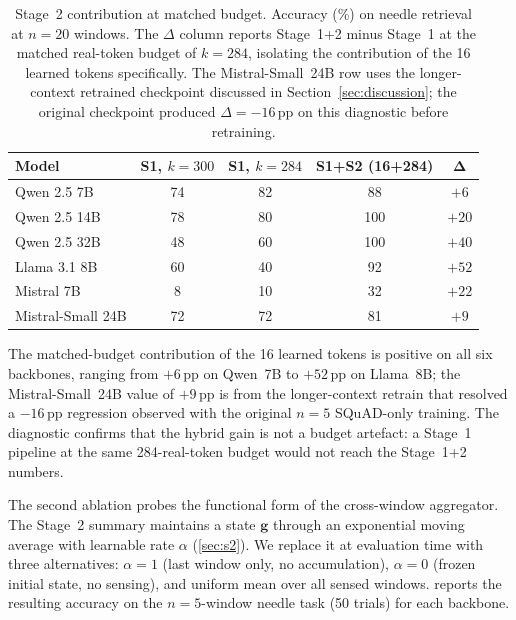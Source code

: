 \begin{table}[t]
\caption{Stage~2 contribution at matched budget. Accuracy (\%) on needle retrieval at $n{=}20$ windows. The $\Delta$ column reports Stage~1+2 minus Stage~1 at the matched real-token budget of $k{=}284$, isolating the contribution of the 16 learned tokens specifically. The Mistral-Small~24B row uses the longer-context retrained checkpoint discussed in Section~\ref{sec:discussion}; the original checkpoint produced $\Delta=-16$\,pp on this diagnostic before retraining.}
\label{tab:kconfound}
\centering
\small
\setlength{\tabcolsep}{6pt}
\begin{tabular}{l c c c c}
\toprule
\textbf{Model} & \textbf{S1, $k{=}300$} & \textbf{S1, $k{=}284$} & \textbf{S1+S2 (16+284)} & $\boldsymbol{\Delta}$ \\
\midrule
Qwen 2.5 7B       & 74 & 82 & 88  & $+6$  \\
Qwen 2.5 14B      & 78 & 80 & 100 & $+20$ \\
Qwen 2.5 32B      & 48 & 60 & 100 & $+40$ \\
Llama 3.1 8B      & 60 & 40 & 92  & $+52$ \\
Mistral 7B        &  8 & 10 & 32  & $+22$ \\
Mistral-Small 24B & 72 & 72 & 81  & $+9$  \\
\bottomrule
\end{tabular}
\end{table}

The matched-budget contribution of the 16 learned tokens is positive on all six backbones, ranging from $+6$\,pp on Qwen~7B to $+52$\,pp on Llama~8B; the Mistral-Small~24B value of $+9$\,pp is from the longer-context retrain that resolved a $-16$\,pp regression observed with the original $n{=}5$ SQuAD-only training. The diagnostic confirms that the hybrid gain is not a budget artefact: a Stage~1 pipeline at the same 284-real-token budget would not reach the Stage~1+2 numbers.

The second ablation probes the functional form of the cross-window aggregator. The Stage~2 summary maintains a state $\mathbf{g}$ through an exponential moving average with learnable rate $\alpha$ (\cref{sec:s2}). We replace it at evaluation time with three alternatives: $\alpha{=}1$ (last window only, no accumulation), $\alpha{=}0$ (frozen initial state, no sensing), and uniform mean over all sensed windows.  reports the resulting accuracy on the $n{=}5$-window needle task (50 trials) for each backbone.

